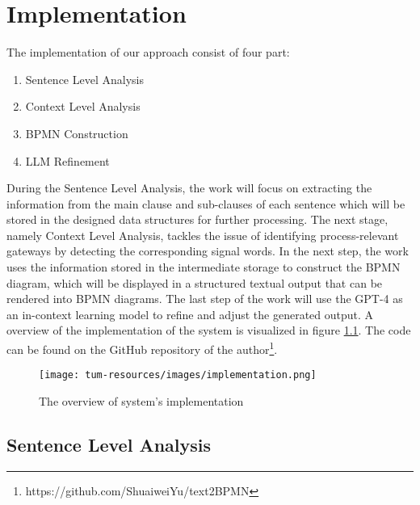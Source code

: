 \chapter{Implementation}
\label{sec:implementation}

The implementation of our approach consist of four part: 

\begin{enumerate}
	\item Sentence Level Analysis
	\item Context Level Analysis
	\item BPMN Construction
	\item LLM Refinement
\end{enumerate}

During the Sentence Level Analysis, the work will focus on extracting the information from the main clause and sub-clauses of each sentence which will be stored in the designed data structures for further processing. The next stage, namely Context Level Analysis, tackles the issue of identifying process-relevant gateways by detecting the corresponding signal words. In the next step, the work uses the information stored in the intermediate storage to construct the BPMN diagram, which will be displayed in a structured textual output that can be rendered into BPMN diagrams. The last step of the work will use the GPT-4 as an in-context learning model to refine and adjust the generated output. A overview of the implementation of the system is visualized in figure \ref{sec:implementation:imp}. The code can be found on the GitHub repository of the author\footnote{https://github.com/ShuaiweiYu/text2BPMN}.

\begin{figure}[h]
    \centering
    \caption{The overview of system's implementation}
    \label{sec:implementation:imp}
    \texttt{[image: tum-resources/images/implementation.png]}
\end{figure}

\section{Sentence Level Analysis}

